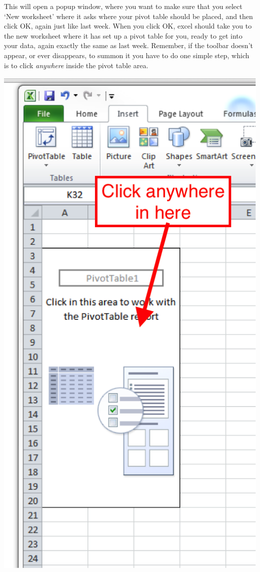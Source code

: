 \documentclass[
]{book}
\begin{document}
This will open a popup window, where you want to make sure that you select `New worksheet' where it asks where your pivot table should be placed, and then click OK, again just like last week. When you click OK, excel should take you to the new worksheet where it has set up a pivot table for you, ready to get into your data, again exactly the same as last week. Remember, if the toolbar doesn't appear, or ever disappears, to summon it you have to do one simple step, which is to click \emph{anywhere} inside the pivot table area.

\includegraphics{imgs/pivot_shell.png}
\end{document}
